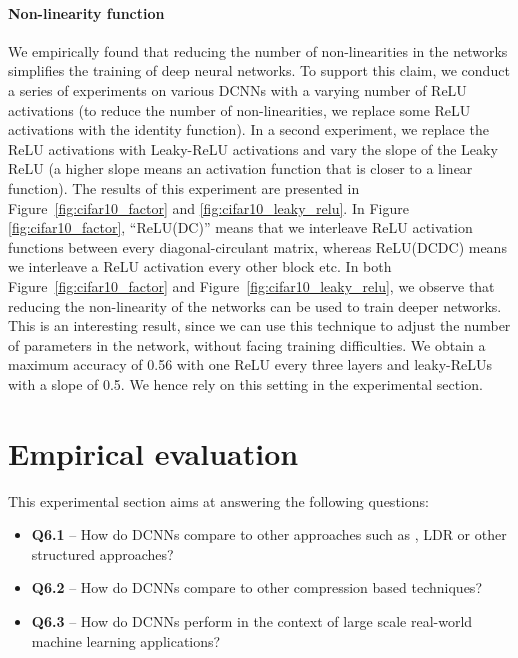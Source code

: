 \paragraph{Non-linearity function}

We empirically found that reducing the number of non-linearities in the networks simplifies the training of deep neural networks.
To support this claim, we conduct a series of experiments on various DCNNs with a varying number of ReLU activations (to reduce the number of non-linearities, we replace some ReLU activations with the identity function).
In a second experiment, we replace the ReLU activations with Leaky-ReLU activations and vary the slope of the Leaky ReLU (a higher slope means an activation function that is closer to a linear function).
The results of this experiment are presented in Figure~\ref{fig:cifar10_factor} and \ref{fig:cifar10_leaky_relu}.
In Figure \ref{fig:cifar10_factor}, ``ReLU(DC)'' means that we interleave ReLU activation functions between every diagonal-circulant matrix, whereas ReLU(DCDC) means we interleave a ReLU activation every other block etc.
In both Figure~\ref{fig:cifar10_factor} and  Figure~\ref{fig:cifar10_leaky_relu}, we observe that reducing the non-linearity of the networks can be used to train deeper networks.
This is an interesting result, since  we can use this technique to adjust the number of parameters in the network, without facing training difficulties. We obtain a maximum accuracy of 0.56 with one ReLU every three layers and leaky-ReLUs with a slope of 0.5.
We hence rely on this setting in the experimental section. 

\section{Empirical evaluation}
\label{section:empirical_evaluation}

This experimental section aims at answering the following questions:
\begin{itemize}
    \item[] \textbf{Q6.1} -- How do DCNNs compare to other approaches such as \ACDC, LDR or other structured approaches?
    \item[] \textbf{Q6.2} -- How do DCNNs compare to other compression based techniques?
    \item[] \textbf{Q6.3} -- How do DCNNs perform in the context of large scale real-world machine learning applications?  
\end{itemize}


